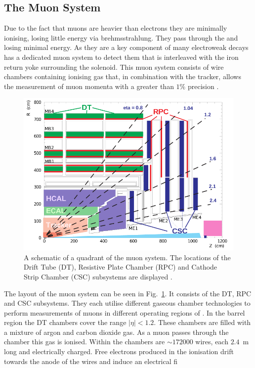 \subsection{The Muon System} 

Due to the fact that muons are heavier than electrons they are
minimally ionising, losing little energy via brehmsstrahlung. They
pass through the \ECAL and \HCAL losing minimal energy. As they are a
key component of many electroweak decays \CMS has a dedicated muon
system to detect them that is interleaved with the iron return yoke
surrounding the solenoid. This muon system consists of wire chambers
containing ionising gas that, in combination with the tracker, allows
the measurement of muon momenta with a greater than $1\%$ precision
\cite{CMS:1997dma}.

\begin{figure}
\begin{center}
\includegraphics[width=0.8\linewidth]{figs/cms_muon} \end{center}
\caption{ A schematic of a quadrant of the \CMS muon system. The
locations of the Drift Tube (DT), Resistive Plate Chamber (RPC) and
Cathode Strip Chamber (CSC) subsystems are displayed
\cite{Kim:2012ix}.}
\label{fig:muon} \end{figure}

The layout of the muon system can be seen in Fig.~\ref{fig:muon}. It
consists of the \ac{DT}, \ac{RPC} and \ac{CSC} subsystems. They each
utilise different gaseous chamber technologies to perform measurements
of muons in different operating regions of \CMS. In the barrel region the
\ac{DT} chambers cover the range $|\eta|<1.2$. These chambers are
filled with a mixture of argon and carbon dioxide gas. As a muon
passes through the chamber this gas is ionised. Within the chambers
are $\sim172000$ wires, each $2.4$~m long and electrically charged.
Free electrons produced in the ionisation drift towards the anode of
the wires and induce an electrical fi

